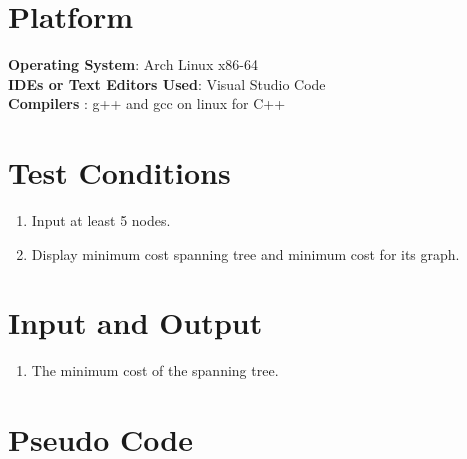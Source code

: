 \documentclass[11pt]{article}
\begin{document}
\section{Platform}
\textbf{\textbf{Operating System}}: Arch Linux x86-64 \\
\textbf{\textbf{IDEs or Text Editors Used}}: Visual Studio Code\\
\textbf{\textbf{Compilers} }: g++ and gcc on linux for C++\\

\section{Test Conditions}
\begin{enumerate}
    \item Input at least 5 nodes.
    \item Display minimum cost spanning tree and minimum cost for its graph.
\end{enumerate}

\section{Input and Output}
\begin{enumerate}
    \item The minimum cost of the spanning tree.
\end{enumerate}

\section{Pseudo Code}
\end{document}
